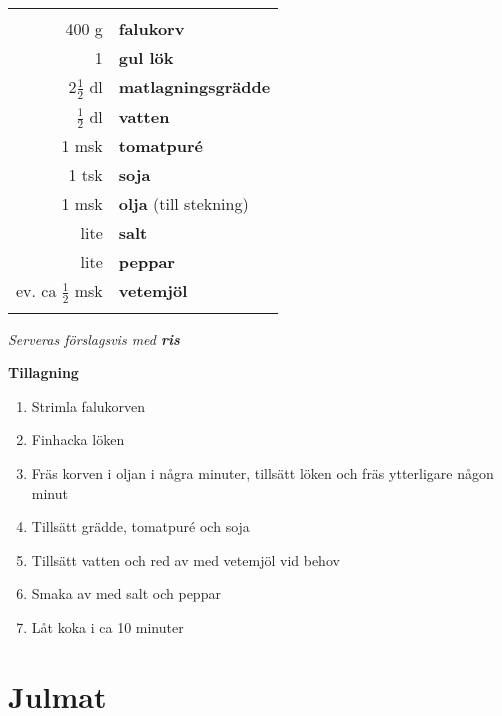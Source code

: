 \documentclass[a4paper,12pt]{article}
\newcommand{\tillb}[1]{\noindent \textit{Serveras förslagsvis med \textbf{#1}} \vspace{1cm}}
\begin{document}
\begin{table}[H]
	\begin{tabular}{rl}
	\hline
	&\\
		400 g & \textbf{falukorv}\\
		1 & \textbf{gul lök}\\
		2$\frac{1}{2}$ dl & \textbf{matlagningsgrädde}\\
		$\frac{1}{2}$ dl & \textbf{vatten}\\
		1 msk & \textbf{tomatpuré}\\
		1 tsk & \textbf{soja}\\
		1 msk & \textbf{olja} (till stekning)\\
		lite & \textbf{salt}\\
		lite & \textbf{peppar}\\
		ev. ca $\frac{1}{2}$ msk & \textbf{vetemjöl}\\
	&\\
	\hline
	\end{tabular}
\end{table}

\tillb{ris}

\begin{multicols*}{2}

\noindent \textbf{Tillagning}
\begin{enumerate}
	\itemsep0cm
	\item Strimla falukorven
	\item Finhacka löken
	\item Fräs korven i oljan i några \mbox{minuter}, tillsätt löken och fräs ytterligare någon minut
	\item Tillsätt grädde, tomatpuré och soja
	\item Tillsätt vatten och red av med vetemjöl vid behov
	\item Smaka av med salt och peppar
	\item Låt koka i ca 10 minuter
\end{enumerate}

\end{multicols*}

\clearpage


\section{Julmat}
\end{document}
